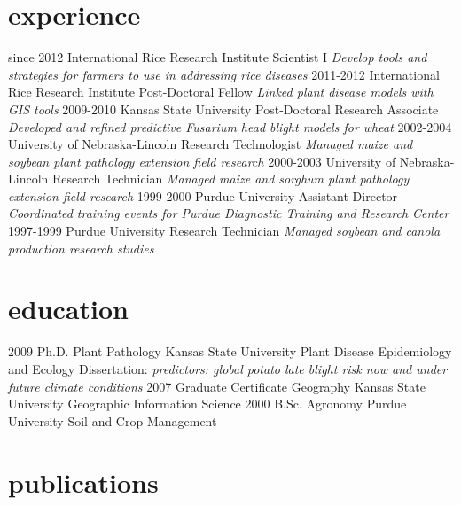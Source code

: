 \documentclass[]{friggeri-cv}
\begin{document}
\section{experience}
\begin{entrylist}
  \entry
    {since 2012}
    {International Rice Research Institute }
    {Scientist I}
    {\emph{Develop tools and strategies for farmers to use in addressing rice diseases}}
  \entry
    {2011-2012}
    {International Rice Research Institute }
    {Post-Doctoral Fellow}
    {\emph{Linked plant disease models with GIS tools}}
  \entry
    {2009-2010}
    {Kansas State University}
    {Post-Doctoral Research Associate}
    {\emph{Developed and refined predictive Fusarium head blight models for wheat}}
  \entry
   {2002-2004}
   {University of Nebraska-Lincoln}
   {Research Technologist}
   {\emph{Managed maize and soybean plant pathology extension field research}}
  \entry
   {2000-2003}
   {University of Nebraska-Lincoln}
   {Research Technician}
   {\emph{Managed maize and sorghum plant pathology extension field research}}
  \entry
   {1999-2000}
   {Purdue University}
   {Assistant Director}
   {\emph{Coordinated training events for Purdue Diagnostic Training and Research Center}}
  \entry
   {1997-1999}
   {Purdue University}
   {Research Technician}
   {\emph{Managed soybean and canola production research studies}}
\end{entrylist}

\section{education}

\begin{entrylist}
  \entry
    {2009}
    {Ph.D. {\normalfont Plant Pathology}}
    {Kansas State University}
    {Plant Disease Epidemiology and Ecology}
  \entry
    {}
    {Dissertation: }
    {}
    {\emph{predictors: global potato late blight risk now and under future climate conditions}}
 \entry
    {2007}
    {Graduate Certificate {\normalfont Geography}}
    {Kansas State University}
    {Geographic Information Science}
  \entry
    {2000}
    {B.Sc. {\normalfont Agronomy}}
    {Purdue University}
    {Soil and Crop Management}
\end{entrylist}

\section{publications}
\end{document}
